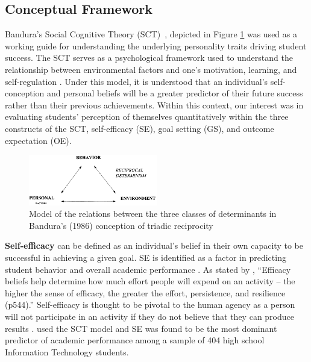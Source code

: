 \documentclass{article}
\begin{document}
\subsection{Conceptual Framework}
\enlargethispage{\baselineskip}

\small

Bandura’s Social Cognitive Theory (SCT)~\cite{bandura1986social}, depicted in Figure \ref{fig:bandura} was used as a working guide for understanding the underlying personality traits driving student success. The SCT serves as a psychological framework used to understand the relationship between environmental factors and one's motivation, learning, and self-regulation \cite{schunk2019}. 
Under this model, it is understood that an individual's self-conception and personal beliefs will be a greater predictor of their future success rather than their previous achievements. Within this context, our interest was in evaluating students' perception of themselves quantitatively within the three constructs of the SCT, self-efficacy (SE), goal setting (GS), and outcome expectation (OE).


\begin{figure}[h]
    \centering
    \includegraphics[width=0.5\textwidth]{Figure_1.png}
    \captionsetup{font=scriptsize} %
    \caption{Model of the relations between the three classes of determinants in Bandura's (1986) conception of triadic reciprocity}
    \label{fig:bandura}
\end{figure}
\vspace{-5pt}




\small
\textbf{Self-efficacy} can be defined as an individual's belief in their own capacity to be successful in achieving a given goal. SE is identified as a factor in predicting student behavior and overall academic performance \cite{kozlowski2020measuring}. As stated by \cite{pajares1996self}, “Efficacy beliefs help determine how much effort people will expend on an activity%
-- the higher the sense of efficacy, the greater the effort, persistence, and resilience (p544).” Self-efficacy is thought to be pivotal to the human agency as a person will not participate in an activity if they do not believe that they can produce results \cite{kozlowski2020measuring}. \cite{bogle2018undergraduate} used the SCT model and SE was found to be the most dominant predictor of academic performance among a sample of 404 high school Information Technology students.
\end{document}
